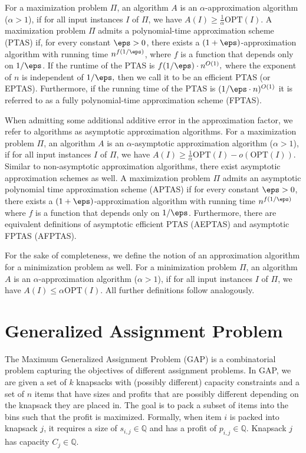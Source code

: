For a maximization problem $\Pi$, an algorithm $A$ is an $\alpha$-approximation algorithm ($\alpha>1$), if for all input instances $I$ of $\Pi$, we have  $A(I)\ge \frac{1}{\alpha} \text{OPT}(I)$. 
A maximization problem $\Pi$ admits a polynomial-time approximation scheme (PTAS) if, for every constant $\eps>0$, there exists a $(1+\eps)$-approximation algorithm with running time $n^{f(1/\eps)}$, where $f$ is a function that depends only on $1/\eps$.
If the runtime of the PTAS is ${f(1/\eps)} \cdot n^{O(1)},$ where the exponent of $n$ is independent of $1/\eps,$ then we call it to be an efficient PTAS (or EPTAS). 
Furthermore, if the running time of the PTAS is $(1/\eps\cdot n)^{O(1)}$ it is referred to as a fully polynomial-time approximation scheme (FPTAS). 

When admitting some additional additive error in the approximation factor, we refer to algorithms as asymptotic approximation algorithms. For a maximization problem $\Pi$, an algorithm $A$ is an $\alpha$-asymptotic approximation algorithm ($\alpha>1$), if for all input instances $I$ of $\Pi$, we have  $A(I)\ge \frac{1}{\alpha} \text{OPT}(I)- o(\text{OPT}(I))$. 
Similar to non-asymptotic approximation algorithms, there exist asymptotic approximation schemes as well. A maximization problem $\Pi$ admits an asymptotic polynomial time approximation scheme (APTAS) if for every constant $\eps>0$, there exists a $(1+\eps)$-approximation algorithm with running time $n^{f(1/\eps)}$ where $f$ is a function that depends only on $1/\eps$. Furthermore, there are equivalent definitions of asymptotic efficient PTAS (AEPTAS) and asymptotic FPTAS (AFPTAS).

For the sake of completeness, we define the notion of an approximation algorithm for a minimization problem as well. 
For a minimization problem $\Pi$, an algorithm $A$ is an $\alpha$-approximation algorithm ($\alpha>1$), if for all input instances $I$ of $\Pi$, we have  $A(I) \le \alpha \text{OPT}(I)$. All further definitions follow analogously.



\section{Generalized Assignment Problem}
\label{subsec:GAP}
The Maximum Generalized Assignment Problem (GAP) is a combinatorial problem capturing the objectives of different assignment problems. In GAP, we are given a set of $k$ knapsacks with (possibly different) capacity constraints and a set of $n$ items that have sizes and profits that are possibly different depending on the knapsack they are placed in. The goal is to pack a subset of items into the bins such that the profit is maximized. Formally, when item $i$ is packed into knapsack $j$, it requires a size of $s_{i,j}\in \mathbb{Q}$ and has a profit of $p_{i,j}\in \mathbb{Q}.$ Knapsack $j$ has capacity $C_j \in \mathbb{Q}$.

